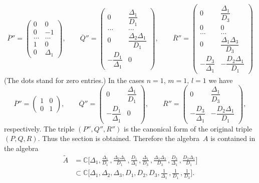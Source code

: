 \documentclass[12pt]{amsart}
\theoremstyle{definition}
\theoremstyle{remark}
\begin{document}
\begin{gather*}
\overline P{}''=\begin{pmatrix} 0 & 0
\\
0 & -1
\\
\hdots & \hdots
\\
1 & 0
\\
0 & \Delta_1
\end{pmatrix},\qquad
\overline Q{}''=\begin{pmatrix} 0 & \dfrac{\Delta_1}{D_1}
\\
\hdots & \hdots
\\
0 & \dfrac{\Delta_2\Delta_1}{D_1}
\\
-\dfrac{D_1}{\Delta_1} & 0
\end{pmatrix},
\qquad \overline R{}''=\begin{pmatrix} 0 & \dfrac{\Delta_1}{D_3}
\\[3mm]
0 & 0
\\
\hdots & \hdots
\\
0 & \dfrac{\Delta_1\Delta_3}{D_3}
\\[3mm]
-\dfrac{D_3}{\Delta_1} & -\dfrac{D_2\Delta_1}{D_1}
\end{pmatrix}
\end{gather*}
(The dots stand for zero entries.) In the cases $n=1$, $m=1$, $l=1$
we have
$$
\overline P{}''=\begin{pmatrix} 1 & 0
\\
0 & 1
\end{pmatrix},\qquad
\overline Q{}''=\begin{pmatrix} 0 & \dfrac{\Delta_1}{D_1}
\\
-\dfrac{D_1}{\Delta_1} & 0
\end{pmatrix},\qquad
\overline R{}''=\begin{pmatrix} 0 & \dfrac{\Delta_1}{D_3}
\\[3mm]
-\dfrac{D_3}{\Delta_1} & -\dfrac{D_2\Delta_1}{D_1}
\end{pmatrix},
$$
respectively. The triple $(P'',Q'',R'')$ is the canonical form of
the original triple $(P,\allowbreak Q,R)$. Thus the section is
obtained. Therefore the algebra~$A$ is contained in the algebra
\begin{align*}
\tilde A&=\mathbb{C}\biggl[\Delta_1,\frac{\Delta_1}{D_1}\,,
\frac{\Delta_2\Delta_1}{D_1}\,,\frac{D_1}{\Delta_1}\,,\frac{\Delta_1}{D_3}\,,
\frac{\Delta_1\Delta_3}{D_3}\,,\frac{D_3}{\Delta_1}\,,
\frac{D_2\Delta_1}{D_1}\biggr]
\\
&\subset \mathbb{C}\biggl[\Delta_1,\Delta_2,\Delta_3,D_1, D_2,
D_3,\frac{1}{\Delta_1}\,,\frac{1}{D_1}\,,\frac{1}{D_3}\biggr].
\end{align*}
\end{document}
